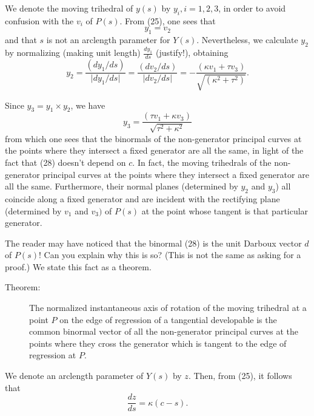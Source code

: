\documentclass{book}
\begin{document}
We denote the moving trihedral of $y(s)$ by $y_{i}, i = 1,2,3$, in order to avoid confusion with the $v_{i}$ of $P(s)$. From (25), one sees that
\begin{equation}
y_{1} = v_{2}
\end{equation}
and that $s$ is not an arclength parameter for $Y(s)$. Nevertheless, we calculate $y_{2}$ by normalizing (making unit length) $\frac{dy_{1}}{ds}$ (justify!), obtaining
\begin{equation}
y_{2} = \frac{(dy_{1} / ds)}{\vert dy_{1} / ds \vert} = \frac{(dv_{2}/ds)}{\vert dv_{2}/ds \vert} = -\frac{ (\kappa v_{1} + \tau v_{3}) }{ \sqrt{(\kappa ^{2} + \tau ^{2})} }.
\end{equation}

Since $y_{3} = y_{1} \times y_{2}$, we have
\begin{equation}
y_{3} = \frac{ (\tau v_{1} + \kappa v_{3}) }{ \sqrt{\tau ^{2} + \kappa ^{2}} }
\end{equation}
from which one sees that the binormals of the non-generator principal curves at the points where they intersect a fixed generator are all the same, in light of the fact that (28) doesn't depend on $c$. In fact, the moving trihedrals of the non-generator principal curves at the points where they intersect a fixed generator are all the same. Furthermore, their normal planes (determined by $y_{2}$ and $y_{3}$) all coincide along a fixed generator and are incident with the rectifying plane (determined by $v_{1}$ and $v_{3})$ of $P(s)$ at the point whose tangent is that particular generator.

The reader may have noticed that the binormal (28) is the unit Darboux vector $d$ of $P(s)$! Can you explain why this is so? (This is not the same as asking for a proof.) We state this fact as a theorem.

\begin{description}
\item[Theorem:] The normalized instantaneous axis of rotation of the moving trihedral at a point $P$ on the edge of regression of a tangential developable is the common binormal vector of all the non-generator principal curves at the points where they cross the generator which is tangent to the edge of regression at $P$.
\end{description}

We denote an arclength parameter of $Y(s)$ by $z$. Then, from (25), it follows that
\begin{equation}
\frac{dz}{ds} = \kappa(c - s).
\end{equation}
\end{document}
